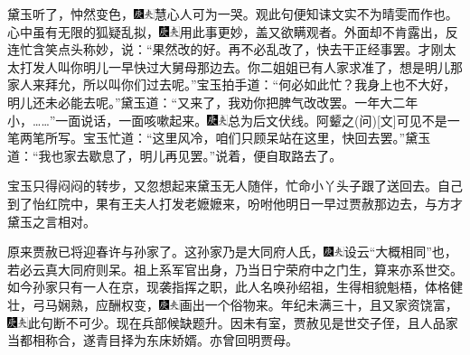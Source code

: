 黛玉听了，忡然变色，{\includegraphics[width=3mm]{../Images/00004}\includegraphics[width=3mm]{../Images/00012}\footnotesize \kaishu 慧心人可为一哭。观此句便知诔文实不为晴雯而作也。}心中虽有无限的狐疑乱拟，{\includegraphics[width=3mm]{../Images/00004}\includegraphics[width=3mm]{../Images/00012}\footnotesize \kaishu 用此事更妙，盖又欲瞒观者。}外面却不肯露出，反连忙含笑点头称妙，说：“果然改的好。再不必乱改了，快去干正经事罢。才刚太太打发人叫你明儿一早快过大舅母那边去。你二姐姐已有人家求准了，想是明儿那家人来拜允，所以叫你们过去呢。”宝玉拍手道：“何必如此忙？我身上也不大好，明儿还未必能去呢。”黛玉道：“又来了，我劝你把脾气改改罢。一年大二年小，\ldots{}\ldots{}”一面说话，一面咳嗽起来。{\includegraphics[width=3mm]{../Images/00004}\includegraphics[width=3mm]{../Images/00012}\footnotesize \kaishu 总为后文伏线。阿颦之{(问)}{[}文{]}可见不是一笔两笔所写。}宝玉忙道：“这里风冷，咱们只顾呆站在这里，快回去罢。”黛玉道：“我也家去歇息了，明儿再见罢。”说着，便自取路去了。

宝玉只得闷闷的转步，又忽想起来黛玉无人随伴，忙命小丫头子跟了送回去。自己到了怡红院中，果有王夫人打发老嬷嬷来，吩咐他明日一早过贾赦那边去，与方才黛玉之言相对。

原来贾赦已将迎春许与孙家了。这孙家乃是大同府人氏，{\includegraphics[width=3mm]{../Images/00004}\includegraphics[width=3mm]{../Images/00012}\footnotesize \kaishu 设云“大概相同”也，若必云真大同府则呆。}祖上系军官出身，乃当日宁荣府中之门生，算来亦系世交。如今孙家只有一人在京，现袭指挥之职，此人名唤孙绍祖，生得相貌魁梧，体格健壮，弓马娴熟，应酬权变，{\includegraphics[width=3mm]{../Images/00004}\includegraphics[width=3mm]{../Images/00012}\footnotesize \kaishu 画出一个俗物来。}年纪未满三十，且又家资饶富，{\includegraphics[width=3mm]{../Images/00004}\includegraphics[width=3mm]{../Images/00012}\footnotesize \kaishu 此句断不可少。}现在兵部候缺题升。因未有室，贾赦见是世交子侄，且人品家当都相称合，遂青目择为东床娇婿。亦曾回明贾母。

